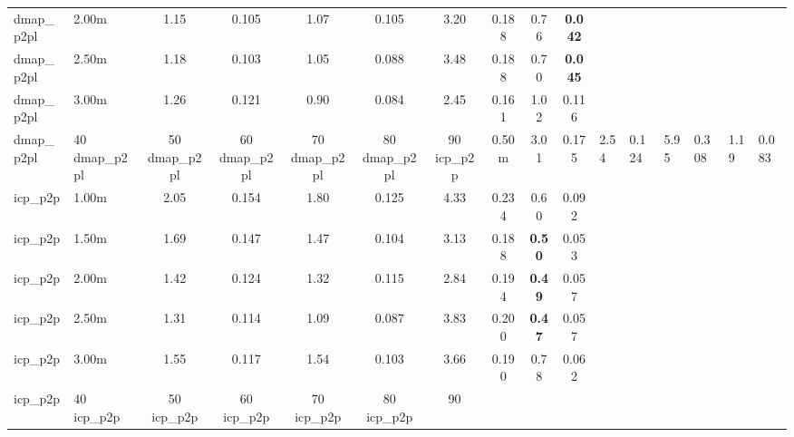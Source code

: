 \begin{tabular}{llcccccccc}
dmap\_p2pl & 2.00m & 1.15 & 0.105 & 1.07 & 0.105 & 3.20 & 0.188 & 0.76 & \bfseries 0.042 \\
dmap\_p2pl & 2.50m & 1.18 & 0.103 & 1.05 & 0.088 & 3.48 & 0.188 & 0.70 & \bfseries 0.045 \\
dmap\_p2pl & 3.00m & 1.26 & 0.121 & 0.90 & 0.084 & 2.45 & 0.161 & 1.02 & 0.116 \\
dmap\_p2pl & 40%
dmap\_p2pl & 50%
dmap\_p2pl & 60%
dmap\_p2pl & 70%
dmap\_p2pl & 80%
dmap\_p2pl & 90%
\midrule
icp\_p2p & 0.50m & 3.01 & 0.175 & 2.54 & 0.124 & 5.95 & 0.308 & 1.19 & 0.083 \\
icp\_p2p & 1.00m & 2.05 & 0.154 & 1.80 & 0.125 & 4.33 & 0.234 & 0.60 & 0.092 \\
icp\_p2p & 1.50m & 1.69 & 0.147 & 1.47 & 0.104 & 3.13 & 0.188 & \bfseries 0.50 & 0.053 \\
icp\_p2p & 2.00m & 1.42 & 0.124 & 1.32 & 0.115 & 2.84 & 0.194 & \bfseries 0.49 & 0.057 \\
icp\_p2p & 2.50m & 1.31 & 0.114 & 1.09 & 0.087 & 3.83 & 0.200 & \bfseries 0.47 & 0.057 \\
icp\_p2p & 3.00m & 1.55 & 0.117 & 1.54 & 0.103 & 3.66 & 0.190 & 0.78 & 0.062 \\
icp\_p2p & 40%
icp\_p2p & 50%
icp\_p2p & 60%
icp\_p2p & 70%
icp\_p2p & 80%
icp\_p2p & 90%

\end{tabular}
